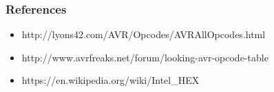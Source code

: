 \documentclass{beamer}
\begin{document}
\begin{frame}
\frametitle{ References }
\begin{itemize}
	\item http://lyons42.com/AVR/Opcodes/AVRAllOpcodes.html
	\item http://www.avrfreaks.net/forum/looking-avr-opcode-table
	\item https://en.wikipedia.org/wiki/Intel\_HEX
\end{itemize}
\end{frame}
\end{document}
